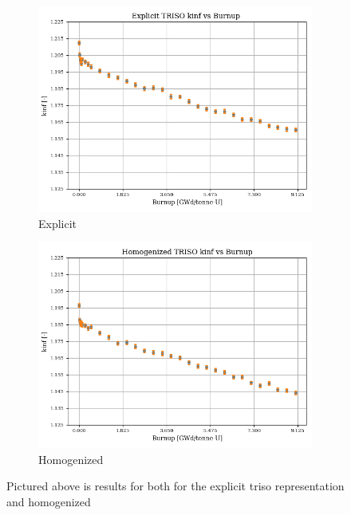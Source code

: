 \documentclass[letterpaper]{physor2024}
\begin{document}
\begin{figure}[!h]
    \centering
    \begin{subfigure}{0.49\linewidth}
        \centering
        \includegraphics[width=\linewidth]{figures/explicit_kinf_vs_burnup.png}
        \caption{Explicit}
        \label{fig:explicit}
    \end{subfigure}
    \begin{subfigure}{0.49\linewidth}
        \centering
        \includegraphics[width=\linewidth]{figures/homogenized_kinf_vs_burnup.png}
        \caption{Homogenized}
        \label{fig:explicit}
    \end{subfigure}
    \caption{Pictured above is results for \kinf both for the explicit \gls{triso} representation and homogenized  }
\end{figure}
\end{document}
